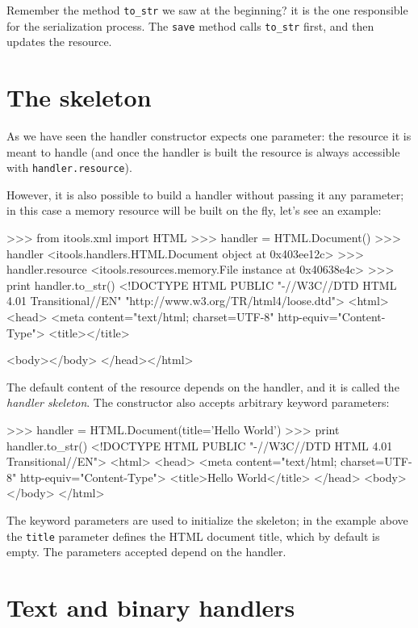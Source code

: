 Remember the method {\tt to\_str} we saw at the beginning? it is the
one responsible for the serialization process. The {\tt save} method
calls {\tt to\_str} first, and then updates the resource.


\section{The skeleton}

As we have seen the handler constructor expects one parameter: the resource
it is meant to handle (and once the handler is built the resource is always
accessible with {\tt handler.resource}).

However, it is also possible to build a handler without passing it any
parameter; in this case a memory resource will be built on the fly, let's
see an example:

\begin{code}
    >>> from itools.xml import HTML
    >>> handler = HTML.Document()
    >>> handler
    <itools.handlers.HTML.Document object at 0x403ee12c>
    >>> handler.resource
    <itools.resources.memory.File instance at 0x40638e4c>
    >>> print handler.to_str()
    <!DOCTYPE HTML PUBLIC "-//W3C//DTD HTML 4.01 Transitional//EN"
      "http://www.w3.org/TR/html4/loose.dtd">
    <html>
      <head>
        <meta content="text/html; charset=UTF-8" http-equiv="Content-Type">
        <title></title>
      
      <body></body>
    </head></html>
\end{code}

The default content of the resource depends on the handler, and it is called
the {\em handler skeleton}. The constructor also accepts arbitrary keyword
parameters:

\begin{code}
    >>> handler = HTML.Document(title='Hello World')
    >>> print handler.to_str()
    <!DOCTYPE HTML PUBLIC "-//W3C//DTD HTML 4.01 Transitional//EN">
    <html>
      <head>
        <meta content="text/html; charset=UTF-8" http-equiv="Content-Type">
        <title>Hello World</title>
      </head>
      <body></body>
    </html>
\end{code}

The keyword parameters are used to initialize the skeleton; in the example
above the {\tt title} parameter defines the HTML document title, which by
default is empty. The parameters accepted depend on the handler.


\section{Text and binary handlers}

